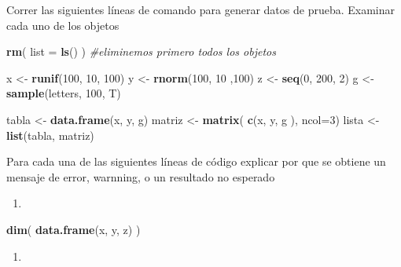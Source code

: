 \documentclass[]{book}
\newenvironment{Shaded}{\begin{snugshade}}{\end{snugshade}}
\newcommand{\CommentTok}[1]{\textcolor[rgb]{0.56,0.35,0.01}{\textit{#1}}}
\newcommand{\DataTypeTok}[1]{\textcolor[rgb]{0.13,0.29,0.53}{#1}}
\newcommand{\DecValTok}[1]{\textcolor[rgb]{0.00,0.00,0.81}{#1}}
\newcommand{\KeywordTok}[1]{\textcolor[rgb]{0.13,0.29,0.53}{\textbf{#1}}}
\newcommand{\NormalTok}[1]{#1}
\newcommand{\StringTok}[1]{\textcolor[rgb]{0.31,0.60,0.02}{#1}}
\begin{document}
Correr las siguientes líneas de comando para generar datos de prueba. Examinar cada uno de los objetos

\begin{Shaded}
\begin{Highlighting}[]
\KeywordTok{rm}\NormalTok{( }\DataTypeTok{list =} \KeywordTok{ls}\NormalTok{() ) }\CommentTok{#eliminemos primero todos los objetos}
\end{Highlighting}
\end{Shaded}

\begin{Shaded}
\begin{Highlighting}[]
\NormalTok{  x <-}\StringTok{ }\KeywordTok{runif}\NormalTok{(}\DecValTok{100}\NormalTok{, }\DecValTok{10}\NormalTok{, }\DecValTok{100}\NormalTok{)}
\NormalTok{        y <-}\StringTok{ }\KeywordTok{rnorm}\NormalTok{(}\DecValTok{100}\NormalTok{, }\DecValTok{10}\NormalTok{ ,}\DecValTok{100}\NormalTok{)}
\NormalTok{        z <-}\StringTok{ }\KeywordTok{seq}\NormalTok{(}\DecValTok{0}\NormalTok{, }\DecValTok{200}\NormalTok{, }\DecValTok{2}\NormalTok{)}
\NormalTok{        g  <-}\StringTok{ }\KeywordTok{sample}\NormalTok{(letters, }\DecValTok{100}\NormalTok{, T)}

\NormalTok{        tabla <-}\StringTok{ }\KeywordTok{data.frame}\NormalTok{(x, y, g)}
\NormalTok{        matriz <-}\StringTok{ }\KeywordTok{matrix}\NormalTok{( }\KeywordTok{c}\NormalTok{(x, y, g ), }\DataTypeTok{ncol=}\DecValTok{3}\NormalTok{)}
\NormalTok{        lista <-}\StringTok{ }\KeywordTok{list}\NormalTok{(tabla, matriz)}
\end{Highlighting}
\end{Shaded}

Para cada una de las siguientes líneas de código explicar por que se obtiene un mensaje de error, warnning, o un resultado no esperado

\begin{enumerate}
\def\labelenumi{\arabic{enumi}.}
\item
\end{enumerate}

\begin{Shaded}
\begin{Highlighting}[]
\KeywordTok{dim}\NormalTok{( }\KeywordTok{data.frame}\NormalTok{(x, y, z) )}
\end{Highlighting}
\end{Shaded}

\begin{enumerate}
\def\labelenumi{\arabic{enumi}.}
\setcounter{enumi}{1}
\item
\end{enumerate}
\end{document}
